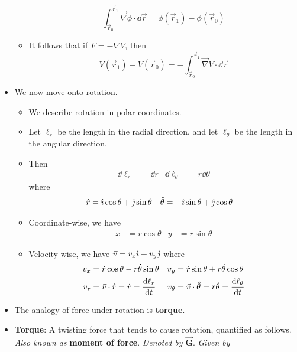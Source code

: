 \documentclass[../notes.tex]{subfiles}
\begin{document}
\begin{itemize}
\begin{itemize}
        \begin{equation*}
            \int_{\vec{r}_0}^{\vec{r}_1}\vec{\nabla}\phi\cdot\dd\vec{r} = \phi(\vec{r}_1)-\phi(\vec{r}_0)
        \end{equation*}
        \item It follows that if $F=-\nabla V$, then
        \begin{equation*}
            V(\vec{r}_1)-V(\vec{r}_0) = -\int_{\vec{r}_0}^{\vec{r}_1}\vec{\nabla}V\cdot\dd\vec{r}
        \end{equation*}
    \end{itemize}
    \item We now move onto rotation.
    \begin{itemize}
        \item We describe rotation in polar coordinates.
        \item Let $\ell_r$ be the length in the radial direction, and let $\ell_\theta$ be the length in the angular direction.
        \item Then
        \begin{align*}
            \dd\ell_r &= \dd{r}&
            \dd\ell_\theta &= r\dd\theta
        \end{align*}
        where
        \begin{align*}
            \hat{r} &= \hat{\imath}\cos\theta+\hat{\jmath}\sin\theta&
            \hat{\theta} &= -\hat{\imath}\sin\theta+\hat{\jmath}\cos\theta
        \end{align*}
        \item Coordinate-wise, we have
        \begin{align*}
            x &= r\cos\theta&
            y &= r\sin\theta
        \end{align*}
        \item Velocity-wise, we have $\vec{v}=v_x\hat{\imath}+v_y\hat{\jmath}$ where
        \begin{align*}
            v_x &= \dot{r}\cos\theta-r\dot{\theta}\sin\theta&
                v_y &= \dot{r}\sin\theta+r\dot{\theta}\cos\theta\\
            v_r &= \vec{v}\cdot\hat{r} = \dot{r} = \dv{\ell_r}{t}&
                v_\theta &= \vec{v}\cdot\hat{\theta} = r\dot{\theta} = \dv{\ell_\theta}{t}
        \end{align*}
    \end{itemize}
    \item The analogy of force under rotation is \textbf{torque}.
    \item \textbf{Torque}: A twisting force that tends to cause rotation, quantified as follows. \emph{Also known as} \textbf{moment of force}. \emph{Denoted by} $\bm{\vec{G}}$. \emph{Given by}

\end{itemize}
\end{document}
